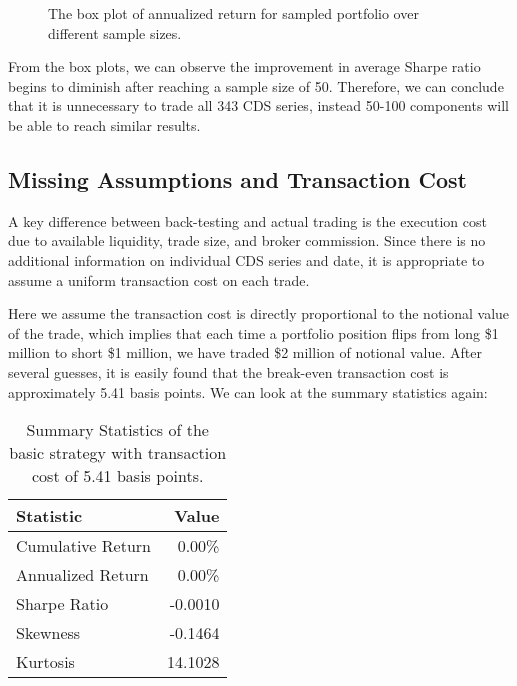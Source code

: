 \documentclass[11pt]{article}
\theoremstyle{definition}
\begin{document}
\begin{figure}[h]
\begin{center}
\end{center}
\centering
\caption{\label{fg:boxplot_return}
The box plot of annualized return for sampled portfolio
over different sample sizes.
}
\end{figure}

From the box plots, we can observe the improvement 
in average Sharpe ratio begins to diminish 
after reaching a sample size of 50.
Therefore, we can conclude that it is unnecessary 
to trade all 343 CDS series, 
instead 50-100 components will be able to reach similar results.

\subsection{Missing Assumptions and Transaction Cost}

A key difference between back-testing and 
actual trading is the execution cost
due to available liquidity, trade size, 
and broker commission.
Since there is no additional information on 
individual CDS series and date,
it is appropriate to assume a uniform 
transaction cost on each trade.

Here we assume the transaction cost is 
directly proportional to the notional value 
of the trade, 
which implies that each time a portfolio 
position flips from long \$1 million to short 
\$1 million, we have traded \$2 million 
of notional value.
After several guesses, it is easily found that 
the break-even transaction cost is approximately
5.41 basis points.
We can look at the summary statistics again:

\begin{table}[h]
\centering
\begin{tabular}{ | l | r | }
  \hline      
  Statistic & Value \\
  \hline
  Cumulative Return & 0.00\% \\
  Annualized Return & 0.00\% \\
  Sharpe Ratio & -0.0010 \\
  Skewness & -0.1464 \\
  Kurtosis & 14.1028 \\
  \hline  
\end{tabular}
\caption{Summary Statistics of the basic strategy
  with transaction cost of 5.41 basis points.}
\label{tab:summary2}
\end{table}
\end{document}
